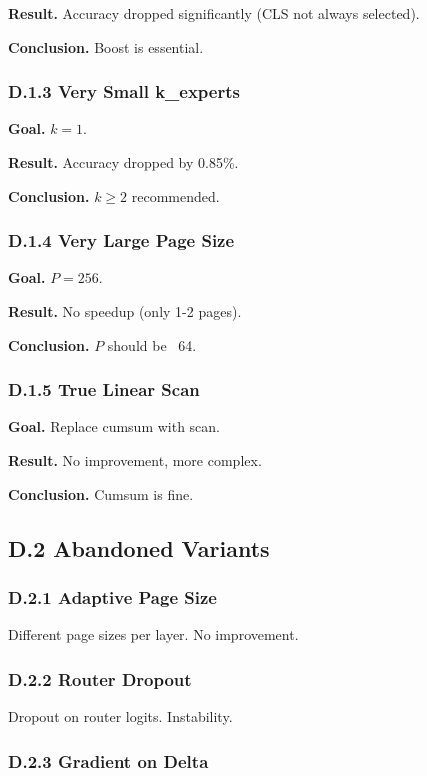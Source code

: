 \textbf{Result.} Accuracy dropped significantly (CLS not always selected).

\textbf{Conclusion.} Boost is essential.

\subsubsection{D.1.3 Very Small k\_experts}

\textbf{Goal.} $k = 1$.

\textbf{Result.} Accuracy dropped by 0.85\%.

\textbf{Conclusion.} $k \geq 2$ recommended.

\subsubsection{D.1.4 Very Large Page Size}

\textbf{Goal.} $P = 256$.

\textbf{Result.} No speedup (only 1-2 pages).

\textbf{Conclusion.} $P$ should be ~64.

\subsubsection{D.1.5 True Linear Scan}

\textbf{Goal.} Replace cumsum with scan.

\textbf{Result.} No improvement, more complex.

\textbf{Conclusion.} Cumsum is fine.

\subsection{D.2 Abandoned Variants}

\subsubsection{D.2.1 Adaptive Page Size}

Different page sizes per layer. No improvement.

\subsubsection{D.2.2 Router Dropout}

Dropout on router logits. Instability.

\subsubsection{D.2.3 Gradient on Delta}

